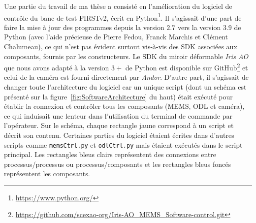 Une partie du travail de ma thèse a consisté en l'amélioration du logiciel de contrôle du banc de test \ac{FIRSTv2}, écrit en Python\footnote{\url{https://www.python.org/}}. Il s'agissait d'une part de faire la mise à jour des programmes depuis la version $2.7$ vers la version $3.9$ de Python (avec l'aide précieuse de Pierre Fedou, Franck Marchis et Clément Chalumeau), ce qui n'est pas évident surtout vis-à-vis des \ac{SDK} associées aux composants, fournis par les constructeurs. Le \ac{SDK} du miroir déformable \textit{Iris AO} que nous avons adapté à la version $3+$ de Python est disponible sur GitHub\footnote{\url{https://github.com/scexao-org/Iris-AO_MEMS_Software-control.git}} et celui de la caméra est fourni directement par \textit{Andor}. D'autre part, il s'agissait de changer toute l'architecture du logiciel car un unique script (dont un schéma est présenté sur la figure~\ref{fig:SoftwareArchitecture} du haut) était exécuté pour établir la connexion et contrôler tous les composants (\ac{MEMS}, \ac{ODL} et caméra), ce qui induisait une lenteur dans l'utilisation du terminal de commande par l'opérateur. Sur le schéma, chaque rectangle jaune correspond à un script et décrit son contenu. Certaines parties du logiciel étaient écrites dans d'autres scripts comme \texttt{memsCtrl.py} et \texttt{odlCtrl.py} mais étaient exécutés dans le script principal. Les rectangles bleus clairs représentent des connexions entre processus/processus ou processus/composants et les rectangles bleus foncés représentent les composants.

